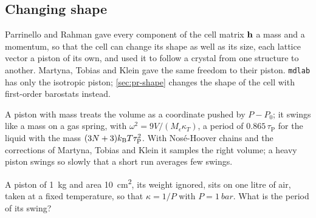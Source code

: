 \subsection*{Changing shape}

Parrinello and Rahman gave every component of the cell matrix $\bm{\mathrm{h}}$ a
mass and a momentum, so that the cell can change its shape as well as its
size, each lattice vector a piston of its own, and used it to follow a
crystal from one structure to another\cite{Parrinello1981}. Martyna,
Tobias and Klein gave the same freedom to their piston. \texttt{mdlab}
has only the isotropic piston; \cref{sec:pr-shape} changes the shape of
the cell with first-order barostats instead.

\begin{keyidea}
A piston with mass treats the volume as a coordinate pushed by $P -
P_0$; it swings like a mass on a gas spring, with $\omega^2 = 9V/(M_\epsilon
\kappa_T)$, a period of $0.865\,\tau_{\mathrm P}$ for the liquid with the
mass $(3N + 3)k_{\mathrm{B}} T\tau_{\mathrm P}^2$. With Nosé-Hoover chains and the
corrections of Martyna, Tobias and Klein it samples the right volume; a
heavy piston swings so slowly that a short run averages few swings.
\end{keyidea}


\begin{selfcheck}
A piston of \SI{1}{\kilo\gram} and area \SI{10}{\centi\metre\squared}, its
weight ignored, sits on one litre of air, taken at a fixed temperature, so that $\kappa
= 1/P$ with $P = \SI{1}{bar}$. What is the period of its swing?
\end{selfcheck}

